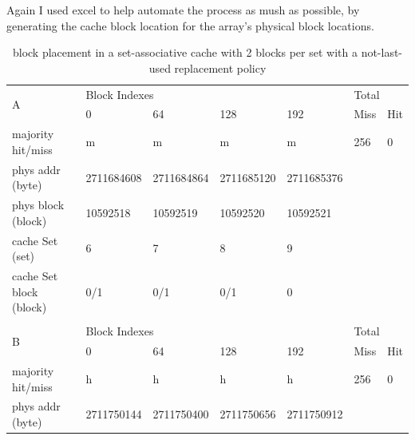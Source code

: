 \documentclass[12pt]{article}
\begin{document}
			Again I used excel to help automate the process as mush as possible, by generating the cache block location for the array's physical block locations.

\begin{table}[H]
\centering
\caption{block placement in a set-associative cache with 2 blocks per set with a not-last-used replacement policy}
\begin{tabular}{lllllll}
\multicolumn{1}{l|}{\multirow{2}{*}{A}}      & \multicolumn{4}{l|}{Block Indexes}                                     & \multicolumn{2}{l}{Total}  \\
\multicolumn{1}{l|}{}                        & 0          & 64         & 128        & \multicolumn{1}{l|}{192}        & Miss         & Hit         \\ \hline
\multicolumn{1}{l|}{majority hit/miss}       & m          & m          & m          & \multicolumn{1}{l|}{m}          & 256          & 0           \\
\multicolumn{1}{l|}{phys addr (byte)}        & 2711684608 & 2711684864 & 2711685120 & \multicolumn{1}{l|}{2711685376} &              &             \\
\multicolumn{1}{l|}{phys block (block)}      & 10592518   & 10592519   & 10592520   & \multicolumn{1}{l|}{10592521}   &              &             \\
\multicolumn{1}{l|}{cache Set (set)}         & 6          & 7          & 8          & \multicolumn{1}{l|}{9}          &              &             \\
\multicolumn{1}{l|}{cache Set block (block)} & 0/1        & 0/1        & 0/1        & \multicolumn{1}{l|}{0}          &              &             \\
                                             &            &            &            &                                 &              &             \\
\multicolumn{1}{l|}{\multirow{2}{*}{B}}      & \multicolumn{4}{l|}{Block Indexes}                                     & \multicolumn{2}{l}{Total}  \\
\multicolumn{1}{l|}{}                        & 0          & 64         & 128        & \multicolumn{1}{l|}{192}        & Miss         & Hit         \\ \hline
\multicolumn{1}{l|}{majority hit/miss}       & h          & h          & h          & \multicolumn{1}{l|}{h}          & 256          & 0           \\
\multicolumn{1}{l|}{phys addr (byte)}        & 2711750144 & 2711750400 & 2711750656 & \multicolumn{1}{l|}{2711750912} &              &             \\

\end{tabular}
\end{table}
\end{document}
